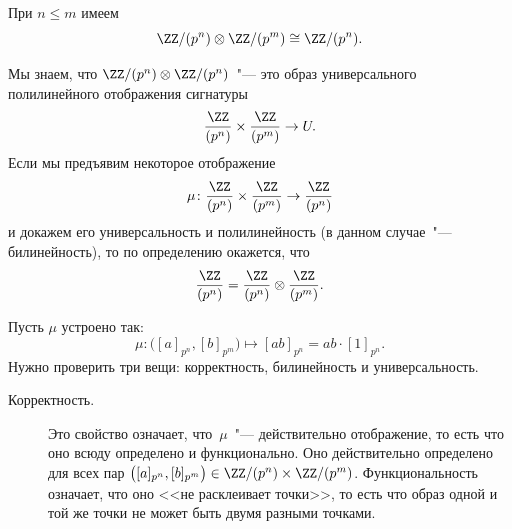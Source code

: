 \begin{example}
	При $n \leq m$ имеем
	\[
		\ZZ/(p^n) \otimes \ZZ/(p^m)
		\cong
		\ZZ/(p^n)
		.
	\]
\end{example}
\begin{proofm}
	Мы знаем, что $\ZZ/(p^n) \otimes \ZZ/(p^n)$~"--- это образ универсального полилинейного отображения сигнатуры
	\[
		\frac{\ZZ}{(p^n)}
		\times
		\frac{\ZZ}{(p^m)}
		\to
		U
		.
	\]
	Если мы предъявим некоторое отображение
	\[
		\mu \colon
		\frac{\ZZ}{(p^n)}
		\times
		\frac{\ZZ}{(p^m)}
		\to
		\frac{\ZZ}{(p^n)}
	\]
	и докажем его универсальность и полилинейность (в данном случае~"--- билинейность), то по определению окажется, что
	\[
		\frac{\ZZ}{(p^n)}
		=
		\frac{\ZZ}{(p^n)}
		\otimes
		\frac{\ZZ}{(p^m)}
		.
	\]

	Пусть $\mu$ устроено так:
	\[
		\mu \colon
		\bigl(
			[a]_{p^n}
			,
			[b]_{p^m}
		\bigr)
		\mapsto
		[ab]_{p^n}
		=
		ab \cdot [1]_{p^n}
		.
	\]
	Нужно проверить три вещи: корректность, билинейность и универсальность.

	\begin{description}
		\item[Корректность.] Это свойство означает, что~$\mu$~"--- действительно отображение, то есть что оно всюду определено и функционально. Оно действительно определено для всех пар 
			$
				\bigl(
					[a]_{p^n}
					,
					[b]_{p^m}
				\bigr)
				\in
				\ZZ/(p^n)
				\times
				\ZZ/(p^m)
			$. Функциональность означает, что оно <<не расклеивает точки>>, то есть что образ одной и той же точки не может быть двумя разными точками.

			

\end{description}
\end{proofm}
